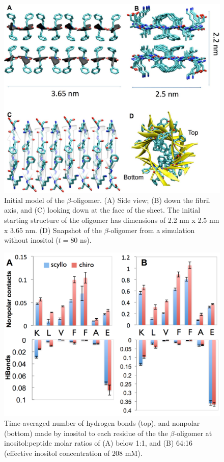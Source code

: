 \begin{figure}[ht]
\centering
\includegraphics[width=15.15cm]{figures/appendixA/inos2_figures_SI_betaInitialModel.pdf}
\caption{Initial model of the $\beta$-oligomer. (A) Side view; (B) down the fibril axis, and (C) looking down at the face of the sheet. The initial starting structure of the oligomer has dimensions of 2.2 nm x 2.5 nm x 3.65 nm. (D) Snapshot of the $\beta$-oligomer from a simulation without inositol ($t=80$ ns).}
\label{fig:SI-betaInitialModel}
\end{figure}

\begin{figure}[ht]
\centering
\includegraphics[width=15.15cm]{figures/appendixA/inos2_figures_SI_betaBinding.pdf}
\caption{Time-averaged number of hydrogen bonds (top), and nonpolar (bottom) made by inositol to each residue of the  the $\beta$-oligomer at inositol:peptide molar ratios of (A) below 1:1, and (B) 64:16 (effective inositol concentration of 208 mM).}
\label{fig:SI-betaBinding}
\end{figure}